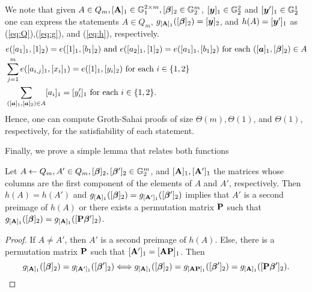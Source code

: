 We note that given $A\in Q_m,[\mathbf{{A}}]_1\in\mathbb{G}^{2\times m}_1,[{\boldsymbol{\beta}}]_2\in\mathbb{G}^m_2$, $[{\boldsymbol{y}}]_1\in\mathbb{G}_2^2$ and $[{\boldsymbol{y}}']_1\in\mathbb{G}^1_2$ one can express the statements $A\in Q_m$, $g_{[\mathbf{{A}}]_1}([{\boldsymbol{\beta}}]_2)=[{\boldsymbol{y}}]_2$, and $h(A)=[{\boldsymbol{y}}']_1$ as (\ref{eq:Q}),(\ref{eq:g}), and (\ref{eq:h}), respectively.
 \begin{align}
&e([a_{1}]_1,[1]_2) = e([1]_1,[{b}_1]_2)\text{ and }e([a_{2}]_1,[1]_2)=e([a_{1}]_1,[b_1]_2)
\text{ for each }([{\boldsymbol{a}}]_1,[{\boldsymbol{\beta}}]_2)\in A \label{eq:Q}\\
&\sum_{j=1}^m e([a_{i,j}]_1,[x_i]_1) = e([1]_1,[y_i]_2) \text{ for each } i\in\{1,2\} \label{eq:g}\\
&\sum_{([{\boldsymbol{a}}]_1,[{\boldsymbol{a}}]_2)\in A} [a_i]_1 = [y'_i]_1 \text{ for each } i\in\{1,2\}.\label{eq:h}
\end{align}
Hence, one can compute Groth-Sahai proofs of size $\Theta(m),\Theta(1)$, and $\Theta(1)$, respectively, for the satisfiability of each statement.

Finally, we prove a simple lemma that relates both functions
\begin{lemma}\label{lemma:hg}
Let $A\gets Q_m,A'\in Q_m,[{\boldsymbol{\beta}}]_2,[{\boldsymbol{\beta}}']_2\in\mathbb{G}^m_2$, and $[\mathbf{{A}}]_1,[\mathbf{{A}}']_1$ the matrices whose columns are the first component of the elements of $A$ and $A'$, respectively. Then $h(A)=h(A')$ and $g_{[\mathbf{{A}}]_1}([{\boldsymbol{\beta}}]_2)=g_{[\mathbf{{A}}']_1}([{\boldsymbol{\beta}}']_2)$ implies that $A'$ is a second preimage of $h(A)$ or there exists a permutation matrix $\mathbf{{P}}$ such that $g_{[\mathbf{{A}}]_1}([{\boldsymbol{\beta}}]_2)=g_{[\mathbf{{A}}]_1}([\mathbf{{P}}{\boldsymbol{\beta}}']_2)$.
\end{lemma}
\begin{proof}
If $A\neq A'$, then $A'$ is a second preimage of $h(A)$. Else, there is a permutation matrix $\mathbf{{P}}$ such that $[\mathbf{{A}}']_1 =[\mathbf{{A}}\mathbf{{P}}]_1$. Then
$$
 g_{[\mathbf{{A}}]_1}([{\boldsymbol{\beta}}]_2)=g_{[\mathbf{{A}}']_1}([{\boldsymbol{\beta}}']_2)\Longleftrightarrow  g_{[\mathbf{{A}}]_1}([{\boldsymbol{\beta}}]_2)=g_{[\mathbf{{A}}\mathbf{{P}}]_1}([{\boldsymbol{\beta}}']_2)=g_{[\mathbf{{A}}]_1}([\mathbf{{P}}{\boldsymbol{\beta}}']_2).
$$
\end{proof}